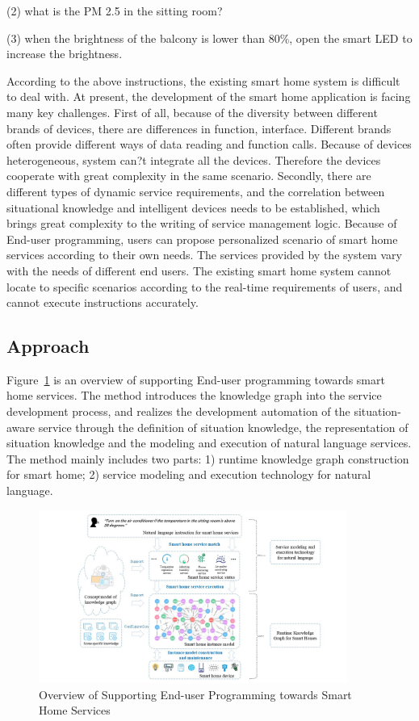 (2) what is the PM 2.5 in the sitting room?

(3) when the brightness of the balcony is lower than 80\%, open the smart LED to increase the brightness.

According to the above instructions, the existing smart home system is difficult to deal with. At present, the development of the smart home application is facing many key challenges. First of all, because of the diversity between different brands of devices, there are differences in function, interface. Different brands often provide different ways of data reading and function calls. Because of devices heterogeneous, system can?t integrate all the devices. Therefore the devices cooperate with great complexity in the same scenario. Secondly, there are different types of dynamic service requirements, and the correlation between situational knowledge and intelligent devices needs to be established, which brings great complexity to the writing of service management logic. Because of End-user programming, users can propose personalized scenario of smart home services according to their own needs. The services provided by the system vary with the needs of different end users. The existing smart home system cannot locate to specific scenarios according to the real-time requirements of users, and cannot execute instructions accurately.


\subsection{Approach}
Figure~\ref{fig:overview} is an overview of supporting End-user programming towards smart home services. The method introduces the knowledge graph into the service development process, and realizes the development automation of the situation-aware service through the definition of situation knowledge, the representation of situation knowledge and the modeling and execution of natural language services. The method mainly includes two parts: 1) runtime knowledge graph construction for smart home; 2) service modeling and execution technology for natural language.

\begin{figure}
	\centering
	\includegraphics[width=0.9\textwidth]{overview.jpg}
	\caption{Overview of Supporting End-user Programming towards Smart Home Services}
	\label{fig:overview}
\end{figure}

